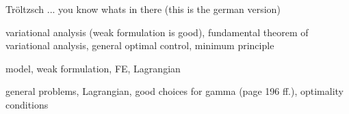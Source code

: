 \documentclass[landscape,parskip=half,7pt]{scrartcl}
\begin{document}
	\cite{Troeltzsch2009OptimaleSteuerungpartiellerDifferentialgleichungenTheorieVerfahrenundAnwendungenbook} Tröltzsch ... you know whats in there (this is the german version)

	\cite{Liberzon2012CalculusVariationsOptimalControlTheoryConciseIntroductionbook} variational analysis (weak formulation is good), fundamental theorem of variational analysis, general optimal control, minimum principle

	\cite{LoosdirekteMethodefuerOptimalsteuerungsproblememitparabolischenDifferentialgleichungenwebpage} model, weak formulation, FE, Lagrangian

	\cite{Stengel1994OptimalControlEstimationbook} general problems, Lagrangian, good choices for gamma (page 196 ff.), optimality conditions

	\printbibliography
\end{document}
